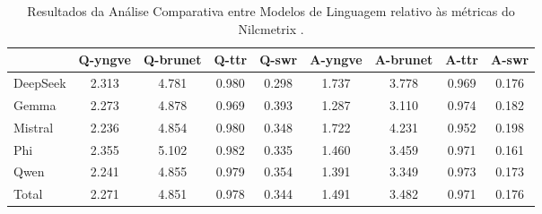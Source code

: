 
\begin{table}[htp!]
\centering
\caption{Resultados da Análise Comparativa entre Modelos de Linguagem relativo às métricas do Nilcmetrix \cite{leal_nilc-metrix_2024}.}
\label{tab:analise_modelos_metrix}
\begin{tabular}{lcccccccc}
\toprule
& \textbf{Q-yngve} & \textbf{Q-brunet} & \textbf{Q-ttr} & \textbf{Q-swr} & \textbf{A-yngve} & \textbf{A-brunet} & \textbf{A-ttr} & \textbf{A-swr} \\ 
\midrule
DeepSeek & 2.313 & 4.781 & 0.980 & 0.298 & 1.737 & 3.778 & 0.969 & 0.176 \\
Gemma    & 2.273 & 4.878 & 0.969 & 0.393 & 1.287 & 3.110 & 0.974 & 0.182 \\
Mistral  & 2.236 & 4.854 & 0.980 & 0.348 & 1.722 & 4.231 & 0.952 & 0.198 \\
Phi      & 2.355 & 5.102 & 0.982 & 0.335 & 1.460 & 3.459 & 0.971 & 0.161 \\
Qwen     & 2.241 & 4.855 & 0.979 & 0.354 & 1.391 & 3.349 & 0.973 & 0.173 \\
\midrule
Total              & 2.271 & 4.851 & 0.978 & 0.344 & 1.491 & 3.482 & 0.971 & 0.176 \\
\bottomrule
\end{tabular}
\end{table}